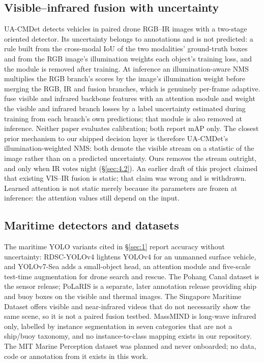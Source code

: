 \documentclass[10pt]{article}
\begin{document}
\subsection{Visible--infrared fusion with uncertainty}\label{sec:2.2}
UA-CMDet \citep{sun2022dronebased} detects vehicles in paired drone RGB--IR images with a two-stage oriented detector. Its uncertainty belongs to annotations and is not predicted: a rule built from the cross-modal IoU of the two modalities' ground-truth boxes and from the RGB image's illumination weights each object's training loss, and the module is removed after training. At inference an illumination-aware NMS multiplies the RGB branch's scores by the image's illumination weight before merging the RGB, IR and fusion branches, which is genuinely per-frame adaptive. \citet{zhao2024uncertaintyaware} fuse visible and infrared backbone features with an attention module and weight the visible and infrared branch losses by a label uncertainty estimated during training from each branch's own predictions; that module is also removed at inference. Neither paper evaluates calibration; both report mAP only. The closest prior mechanism to our shipped decision layer is therefore UA-CMDet's illumination-weighted NMS: both demote the visible stream on a statistic of the image rather than on a predicted uncertainty. Ours removes the stream outright, and only when IR votes night (\S\ref{sec:4.2}). An earlier draft of this project claimed that existing VIS--IR fusion is static; that claim was wrong and is withdrawn. Learned attention is not static merely because its parameters are frozen at inference: the attention values still depend on the input.

\subsection{Maritime detectors and datasets}\label{sec:2.3}
The maritime YOLO variants cited in \S\ref{sec:1} report accuracy without uncertainty: RDSC-YOLOv4 lightens YOLOv4 for an unmanned surface vehicle, and YOLOv7-Sea adds a small-object head, an attention module and five-scale test-time augmentation for drone search and rescue. The Pohang Canal dataset \citep{chung2023pohang} is the sensor release; PoLaRIS \citep{choi2025polaris} is a separate, later annotation release providing ship and buoy boxes on the visible and thermal images. The Singapore Maritime Dataset \citep{prasad2017video} offers visible and near-infrared videos that do not necessarily show the same scene, so it is not a paired fusion testbed. MassMIND \citep{nirgudkar2023massmind} is long-wave infrared only, labelled by instance segmentation in seven categories that are not a ship/buoy taxonomy, and no instance-to-class mapping exists in our repository. The MIT Marine Perception dataset was planned and never onboarded; no data, code or annotation from it exists in this work.
\end{document}
